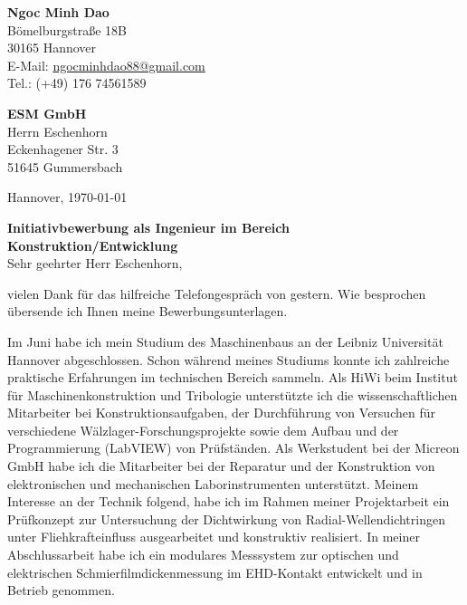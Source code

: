 \documentclass[11pt,a4paper]{letter}
\newcommand{\FirmaName}{ESM GmbH}
\newcommand{\FirmaAdresseLineOne}{Eckenhagener Str. 3}
\newcommand{\FirmaAdresseLineTwo}{51645 Gummersbach}
\newcommand{\AnsprechpartnerVoll}{Herrn Eschenhorn}
\newcommand{\Ansprechpartner}{Eschenhorn}
\newcommand{\Ansprechpartnerin}{Köllmann}
\begin{document}
\pagestyle{empty}

\begin{flushleft}
    \textbf{Ngoc Minh Dao}\\
    Bömelburgstraße 18B\\
    30165 Hannover\\
    E-Mail: \href{mailto:ngocminhdao88@gmail.com}{ngocminhdao88@gmail.com}\\
    Tel.: (+49) 176 74561589
\end{flushleft}

\begin{flushleft}
    \textbf{\FirmaName}\\
    \AnsprechpartnerVoll\\
    \FirmaAdresseLineOne\\
    \FirmaAdresseLineTwo\\
\end{flushleft}

\begin{flushright}
    Hannover, \today
\end{flushright}

\textbf{Initiativbewerbung als Ingenieur im Bereich Konstruktion/Entwicklung}\\

Sehr geehrter Herr \Ansprechpartner,

vielen Dank für das hilfreiche Telefongespräch von gestern.
Wie besprochen übersende ich Ihnen meine Bewerbungsunterlagen.

Im Juni habe ich mein Studium des Maschinenbaus an der Leibniz Universität Hannover abgeschlossen.
Schon während meines Studiums konnte ich zahlreiche praktische Erfahrungen im technischen Bereich sammeln.
Als HiWi beim Institut für Maschinenkonstruktion und Tribologie unterstützte ich die wissenschaftlichen Mitarbeiter bei Konstruktionsaufgaben, der Durchführung von Versuchen für verschiedene Wälzlager-Forschungsprojekte sowie dem Aufbau und der Programmierung (LabVIEW) von Prüfständen.
Als Werkstudent bei der Micreon GmbH habe ich die Mitarbeiter bei der Reparatur und der Konstruktion von elektronischen und mechanischen Laborinstrumenten unterstützt.
Meinem Interesse an der Technik folgend, habe ich im Rahmen meiner Projektarbeit ein Prüfkonzept zur Untersuchung der Dichtwirkung von Radial-Wellendichtringen unter Fliehkrafteinfluss ausgearbeitet und konstruktiv realisiert.
In meiner Abschlussarbeit habe ich ein modulares Messsystem zur optischen und elektrischen Schmierfilmdickenmessung im EHD-Kontakt entwickelt und in Betrieb genommen.
\end{document}

